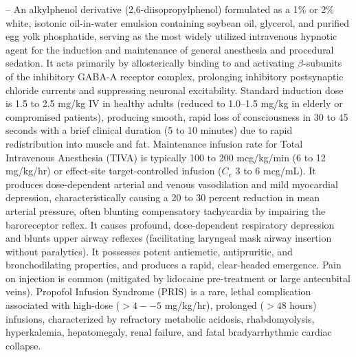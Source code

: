 -- An alkylphenol derivative (2,6-diisopropylphenol) formulated as a 1\% or 2\% white, isotonic oil-in-water emulsion containing soybean oil, glycerol, and purified egg yolk phosphatide, serving as the most widely utilized intravenous hypnotic agent for the induction and maintenance of general anesthesia and procedural sedation. It acts primarily by allosterically binding to and activating $\beta$-subunits of the inhibitory GABA-A receptor complex, prolonging inhibitory postsynaptic chloride currents and suppressing neuronal excitability. Standard induction dose is 1.5 to 2.5 mg/kg IV in healthy adults (reduced to 1.0--1.5 mg/kg in elderly or compromised patients), producing smooth, rapid loss of consciousness in 30 to 45 seconds with a brief clinical duration (5 to 10 minutes) due to rapid redistribution into muscle and fat. Maintenance infusion rate for Total Intravenous Anesthesia (TIVA) is typically 100 to 200 mcg/kg/min (6 to 12 mg/kg/hr) or effect-site target-controlled infusion ($C_e$ 3 to 6 mcg/mL). It produces dose-dependent arterial and venous vasodilation and mild myocardial depression, characteristically causing a 20 to 30 percent reduction in mean arterial pressure, often blunting compensatory tachycardia by impairing the baroreceptor reflex. It causes profound, dose-dependent respiratory depression and blunts upper airway reflexes (facilitating laryngeal mask airway insertion without paralytics). It possesses potent antiemetic, antipruritic, and bronchodilating properties, and produces a rapid, clear-headed emergence. Pain on injection is common (mitigated by lidocaine pre-treatment or large antecubital veins). Propofol Infusion Syndrome (PRIS) is a rare, lethal complication associated with high-dose ($>4--5$ mg/kg/hr), prolonged ($>48$ hours) infusions, characterized by refractory metabolic acidosis, rhabdomyolysis, hyperkalemia, hepatomegaly, renal failure, and fatal bradyarrhythmic cardiac collapse.

